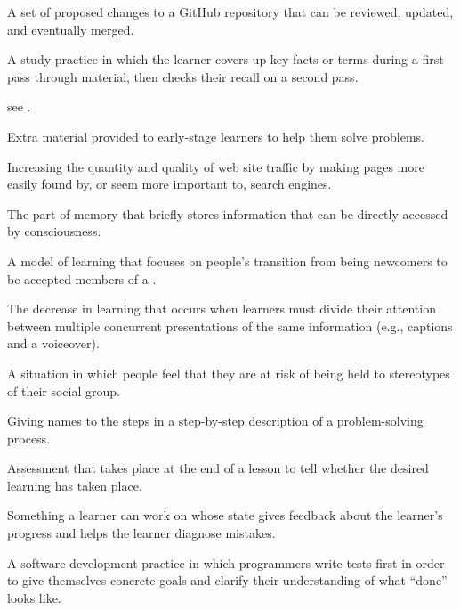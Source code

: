 \begin{description}
 A set of proposed changes to a GitHub
repository that can be reviewed, updated, and eventually merged.

 A study practice in which
the learner covers up key facts or terms during a first pass through material,
then checks their recall on a second pass.

 see .

 Extra material provided to early-stage
learners to help them solve problems.

 Increasing the quantity and quality
of web site traffic by making pages more easily found by, or seem more important
to, search engines.

 The part of memory that briefly
stores information that can be directly accessed by consciousness.

 A model of learning that focuses
on people's transition from being newcomers to be accepted members of a
.

 The decrease in
learning that occurs when learners must divide their attention between multiple
concurrent presentations of the same information (e.g., captions and a
voiceover).

 A situation in which people feel
that they are at risk of being held to stereotypes of their social group.

 Giving names to the steps in a
step-by-step description of a problem-solving process.

 Assessment that takes
place at the end of a lesson to tell whether the desired learning has taken
place.

 Something a learner can work on
whose state gives feedback about the learner's progress and helps the learner
diagnose mistakes.

 A software
development practice in which programmers write tests first in order to give
themselves concrete goals and clarify their understanding of what ``done'' looks
like.


\end{description}
